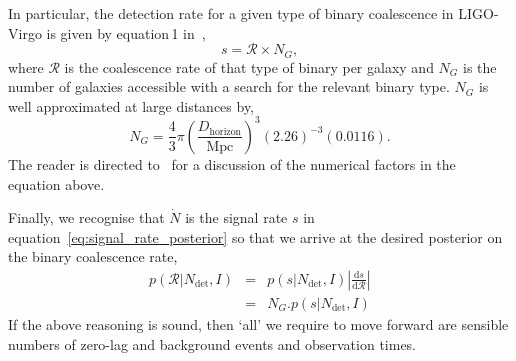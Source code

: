 \documentclass[twocolumn,nofootinbib]{revtex4-1}
\newcommand{\cbcrate}{{{\mathcal R}}}
\newcommand{\diff}{{\mathrm d}}
\begin{document}
In particular,  the detection rate for a given type of binary coalescence in
LIGO-Virgo is given by equation\,1 in~\cite{rates_paper},
\begin{equation}
s = \cbcrate \times N_G,
\end{equation}
%
where $\cbcrate$ is the coalescence rate of that type of binary per galaxy and
$N_G$ is the number of galaxies accessible with a search for the relevant binary
type.  $N_G$ is well approximated at large distances by,
%
\begin{equation}
N_G = \frac{4}{3} \pi \left( \frac{D_{\textrm{horizon}}}{\textrm{Mpc}}
\right)^3 (2.26)^{-3} (0.0116).
\end{equation}
%
The reader is directed to~\cite{rates_paper} for a discussion of the numerical
factors in the equation above.

Finally, we recognise that $\dot{N}$ is the signal rate $s$ in
equation~\ref{eq:signal_rate_posterior} so that we arrive at the desired
posterior on the binary coalescence rate, 
%
\begin{eqnarray}
p(\cbcrate|N_{\textrm{det}},I) & = & p(s|N_{\textrm{det}},I) \left|\frac{\diff
s}{\diff \cbcrate}\right| \\
& = & N_G . p(s|N_{\textrm{det}},I)
\end{eqnarray}
%
If the above reasoning is sound, then `all' we require to move forward are
sensible numbers of zero-lag and background events and observation times.
\end{document}
